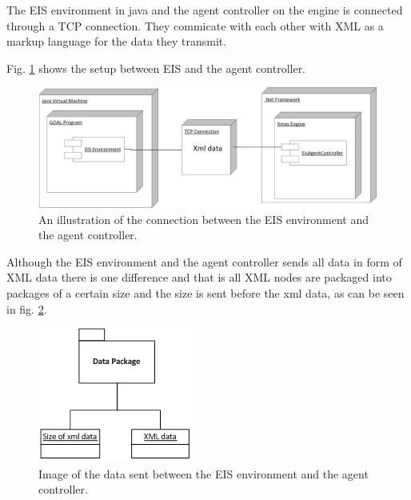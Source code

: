 The EIS environment in java and the agent controller on the engine
is connected through a TCP connection. They commicate with each other
with XML as a markup language for the data they transmit. 

Fig. \ref{fig:DeploymentEISandAgentController} shows the setup between
EIS and the agent controller.

\begin{figure}
\begin{centering}
\includegraphics[width=1\textwidth]{DeploymentEISandAgentController}
\par\end{centering}

\caption{An illustration of the connection between the EIS environment and
the agent controller.\label{fig:DeploymentEISandAgentController}}


\end{figure}


Although the EIS environment and the agent controller sends all data
in form of XML data there is one difference and that is all XML nodes
are packaged into packages of a certain size and the size is sent
before the xml data, as can be seen in fig. \ref{fig:DataPackaging}.

\begin{figure}
\includegraphics[scale=0.8]{XMLDataPackageFigure}

\caption{Image of the data sent between the EIS environment and the agent controller.\label{fig:DataPackaging}}


\end{figure}


